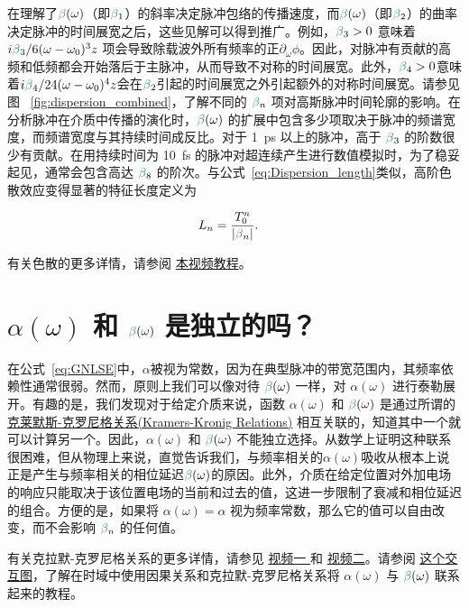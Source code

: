 在理解了$\betag(\omega)$（即$\betag_1$）的斜率决定脉冲包络的传播速度，而$\betag(\omega)$（即$\betag_2$）的曲率决定脉冲的时间展宽之后，这些见解可以得到推广。例如，$\betag_3>0$ 意味着$i\betag_3/6(\omega-\omega_0)^3z$ 项会导致除载波外所有频率的正$\partial_\omega\phi$。因此，对脉冲有贡献的高频和低频都会开始落后于主脉冲，从而导致不对称的时间展宽。此外，$\betag_4>0$意味着$i\betag_4/24(\omega-\omega_0)^4z$会在$\betag_2$引起的时间展宽之外引起额外的对称时间展宽。请参见图 ~\ref{fig:dispersion_combined}，了解不同的 $\betag_n$ 项对高斯脉冲时间轮廓的影响。在分析脉冲在介质中传播的演化时，$\betag(\omega)$ 的扩展中包含多少项取决于脉冲的频谱宽度，而频谱宽度与其持续时间成反比。对于 1~ps 以上的脉冲，高于 $\betag_3$ 的阶数很少有贡献。在用持续时间为 10~fs 的脉冲对超连续产生进行数值模拟时，为了稳妥起见，通常会包含高达 $\betag_8$ 的阶次。与公式~\ref{eq:Dispersion_length}类似，高阶色散效应变得显著的特征长度定义为

\begin{align}
\label{eq:dispersion_length_general}
    L_{n} &= \frac{T_0^n}{|\betag_n|}.
\end{align}

有关色散的更多详情，请参阅 \href{https://www.youtube.com/watch?v=E3S0BQiy3p8&ab_channel=YourFavouriteTA}{本视频教程}。


\section{$\alpha(\omega)$ 和 $\betag(\omega)$ 是独立的吗？}
\label{sec:KK_relations}

在公式~\ref{eq:GNLSE}中，$\alpha$被视为常数，因为在典型脉冲的带宽范围内，其频率依赖性通常很弱。然而，原则上我们可以像对待 $\betag(\omega)$ 一样，对 $\alpha(\omega)$ 进行泰勒展开。有趣的是，我们发现对于给定介质来说，函数 $\alpha(\omega)$ 和 $\betag(\omega)$ 是通过所谓的 \href{https://en.wikipedia.org/wiki/Kramers%E2%80%93Kronig_relations#Related_proof_from_the_time_domain}{克莱默斯-克罗尼格关系(Kramers-Kronig Relations)} 相互关联的，知道其中一个就可以计算另一个。因此，$\alpha(\omega)$ 和 $\betag(\omega)$ 不能独立选择。从数学上证明这种联系很困难，但从物理上来说，直觉告诉我们，与频率相关的$\alpha(\omega)$吸收从根本上说正是产生与频率相关的相位延迟$\betag(\omega)$的原因。此外，介质在给定位置对外加电场的响应只能取决于该位置电场的当前和过去的值，这进一步限制了衰减和相位延迟的组合。方便的是，如果将 $\alpha(\omega)=\alpha$ 视为频率常数，那么它的值可以自由改变，而不会影响 $\betag_n$ 的任何值。 

有关克拉默-克罗尼格关系的更多详情，请参见 \href{https://www.youtube.com/watch?v=vzBnsG2rKWs}{视频一 } 和 \href{https://www.youtube.com/watch?v=rFTUTxPHYYw}{视频二}。请参阅 \href{https://www.desmos.com/calculator/1zymtgbbrv}{这个交互图}，了解在时域中使用因果关系和克拉默-克罗尼格关系将 $\alpha(\omega)$ 与 $\betag(\omega)$ 联系起来的教程。


